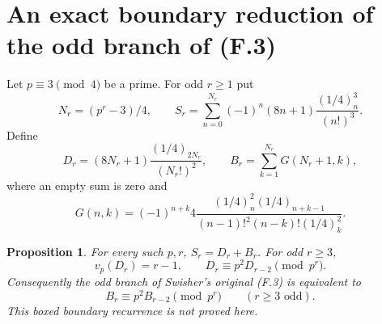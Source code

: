 \documentclass[11pt,letterpaper]{article}
\newtheorem{proposition}[theorem]{Proposition}
\numberwithin{equation}{section}
\begin{document}
\section{An exact boundary reduction of the odd branch of (F.3)}\label{loc-I-4}
Let $p\equiv3\pmod4$ be a prime. For odd $r\ge1$ put
\[
 N_r=(p^r-3)/4,\qquad
 S_r=\sum_{n=0}^{N_r}(-1)^n(8n+1)\frac{(1/4)_n^3}{(n!)^3}.
\]
Define
\[
 D_r=(8N_r+1)\frac{(1/4)_{2N_r}}{(N_r!)^2},\qquad
 B_r=\sum_{k=1}^{N_r}G(N_r+1,k),
\]
where an empty sum is zero and
\[
 G(n,k)=(-1)^{n+k}4
 \frac{(1/4)_n^2(1/4)_{n+k-1}}
 {(n-1)!^2(n-k)!(1/4)_k^2}.
\]
\begin{proposition}
For every such $p,r$, $S_r=D_r+B_r$. For odd $r\ge3$,
\[
 v_p(D_r)=r-1,\qquad D_r\equiv p^2D_{r-2}\pmod{p^r}.
\]
Consequently the odd branch of Swisher's original (F.3) is equivalent to
\[
 \boxed{B_r\equiv p^2B_{r-2}\pmod{p^r}}\qquad(r\ge3\text{ odd}).
\]
This boxed boundary recurrence is not proved here.
\end{proposition}
\end{document}

